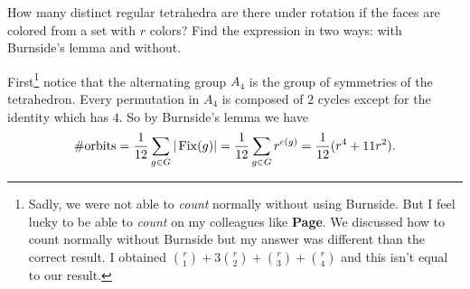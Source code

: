 \documentclass[12pt]{memoir}
\begin{document}
\newpage
\begin{Ej}[6.10 Sagan]
    How many distinct regular tetrahedra are there under rotation if the faces are colored from a set with $r$ colors? Find the expression in two ways: with Burnside's lemma and without.
\end{Ej}

\begin{ptcbr}
    First\footnote{Sadly, we were not able to \emph{count} normally without using Burnside. But I feel lucky to be able to \emph{count} on my colleagues like \textbf{Page}. We discussed how to count normally without Burnside but my answer was different than the correct result. I obtained $\binom{r}{1}+3\binom{r}{2}+\binom{r}{3}+\binom{r}{4}$ and this isn't equal to our result.} notice that the alternating group $A_4$ is the group of symmetries of the tetrahedron. Every permutation in $A_4$ is composed of $2$ cycles except for the identity which has $4$. So by Burnside's lemma we have 
    $$\#\text{orbits}=\frac{1}{12}\sum_{g\in G}|\operatorname{Fix}(g)|=\frac{1}{12}\sum_{g\in G}r^{c(g)}=\frac{1}{12}(r^4+11r^2).$$
\end{ptcbr}
\iffalse
\begin{Ej}
    Prove that $e^{\frac{2\pi i k}{n}}$ is a primitive root of unity if and only if $\gcd(k,n)=1$. Then prove that 
    $$\left(\binom{\bonj{n}}{k},\genr{(12\dots n)},\right)$$
\end{Ej}
\fi
\end{document}
